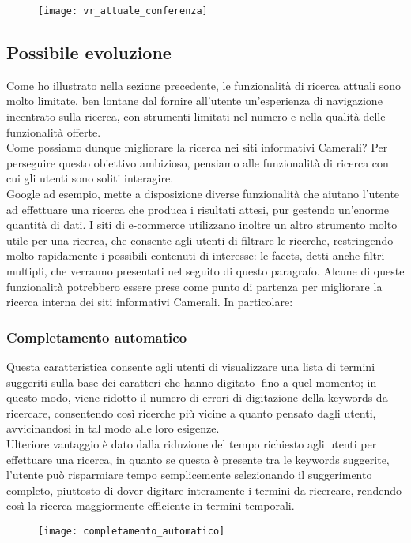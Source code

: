 		\begin{figure}[htbp]
			\label{img:conferenza}
			\begin{center}
				\texttt{[image: vr\_attuale\_conferenza]}
			\end{center}
		\end{figure}
		
		\newpage
		\subsection{Possibile evoluzione}
		\label{sub:possibile_evoluzione}
		Come ho illustrato nella sezione precedente, le funzionalità di ricerca attuali sono molto limitate, ben lontane dal fornire all'utente un'esperienza di navigazione incentrato sulla ricerca, con strumenti limitati nel numero e nella qualità delle funzionalità offerte. \\
		Come possiamo dunque migliorare la ricerca nei siti informativi Camerali?
		Per perseguire questo obiettivo ambizioso, pensiamo alle funzionalità di ricerca con cui gli utenti sono soliti interagire. \\		
		Google ad esempio, mette a disposizione diverse funzionalità che aiutano l’utente ad effettuare una ricerca che produca i risultati attesi, pur gestendo un'enorme quantità di dati. I siti di e-commerce utilizzano inoltre un altro strumento molto utile per una ricerca, che consente agli utenti di filtrare le ricerche, restringendo molto rapidamente i possibili contenuti di interesse: le facets, detti anche filtri multipli, che verranno presentati nel seguito di questo paragrafo. Alcune di queste funzionalità potrebbero essere prese come punto di partenza per migliorare la ricerca interna dei siti informativi Camerali. In particolare:
		
			\subsubsection{Completamento automatico}
			Questa caratteristica consente agli utenti di visualizzare una lista di termini suggeriti sulla base dei caratteri che hanno digitato fino a quel momento; in questo modo, viene ridotto il numero di errori di digitazione della keywords da ricercare, consentendo così ricerche più vicine a quanto pensato dagli utenti, avvicinandosi in tal modo alle loro esigenze. \\ Ulteriore vantaggio è dato dalla riduzione del tempo richiesto agli utenti per effettuare una ricerca, in quanto se questa è presente tra le keywords suggerite, l'utente può risparmiare tempo semplicemente selezionando il suggerimento completo, piuttosto di dover digitare interamente i termini da ricercare, rendendo così la ricerca maggiormente efficiente in termini temporali.
			\begin{figure}[htbp]
				\begin{center}
					\texttt{[image: completamento\_automatico]}
				\end{center}
			\end{figure}
		
